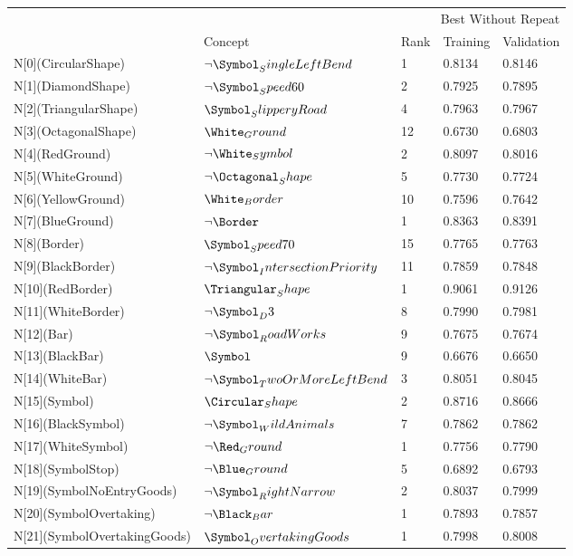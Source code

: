 \begin{tabular}{lllll}
\toprule
 & \multicolumn{4}{r}{Best Without Repeat} \\
 & Concept & Rank & Training & Validation \\
\midrule
N[0](CircularShape) & $\neg \Symbol_SingleLeftBend$ & 1 & 0.8134 & 0.8146 \\
N[1](DiamondShape) & $\neg \Symbol_Speed60$ & 2 & 0.7925 & 0.7895 \\
N[2](TriangularShape) & $\Symbol_SlipperyRoad$ & 4 & 0.7963 & 0.7967 \\
N[3](OctagonalShape) & $\White_Ground$ & 12 & 0.6730 & 0.6803 \\
N[4](RedGround) & $\neg \White_Symbol$ & 2 & 0.8097 & 0.8016 \\
N[5](WhiteGround) & $\neg \Octagonal_Shape$ & 5 & 0.7730 & 0.7724 \\
N[6](YellowGround) & $\White_Border$ & 10 & 0.7596 & 0.7642 \\
N[7](BlueGround) & $\neg \Border$ & 1 & 0.8363 & 0.8391 \\
N[8](Border) & $\Symbol_Speed70$ & 15 & 0.7765 & 0.7763 \\
N[9](BlackBorder) & $\neg \Symbol_IntersectionPriority$ & 11 & 0.7859 & 0.7848 \\
N[10](RedBorder) & $\Triangular_Shape$ & 1 & 0.9061 & 0.9126 \\
N[11](WhiteBorder) & $\neg \Symbol_D3$ & 8 & 0.7990 & 0.7981 \\
N[12](Bar) & $\neg \Symbol_RoadWorks$ & 9 & 0.7675 & 0.7674 \\
N[13](BlackBar) & $\Symbol$ & 9 & 0.6676 & 0.6650 \\
N[14](WhiteBar) & $\neg \Symbol_TwoOrMoreLeftBend$ & 3 & 0.8051 & 0.8045 \\
N[15](Symbol) & $\Circular_Shape$ & 2 & 0.8716 & 0.8666 \\
N[16](BlackSymbol) & $\neg \Symbol_WildAnimals$ & 7 & 0.7862 & 0.7862 \\
N[17](WhiteSymbol) & $\neg \Red_Ground$ & 1 & 0.7756 & 0.7790 \\
N[18](SymbolStop) & $\neg \Blue_Ground$ & 5 & 0.6892 & 0.6793 \\
N[19](SymbolNoEntryGoods) & $\neg \Symbol_RightNarrow$ & 2 & 0.8037 & 0.7999 \\
N[20](SymbolOvertaking) & $\neg \Black_Bar$ & 1 & 0.7893 & 0.7857 \\
N[21](SymbolOvertakingGoods) & $\Symbol_OvertakingGoods$ & 1 & 0.7998 & 0.8008 \\

\end{tabular}

